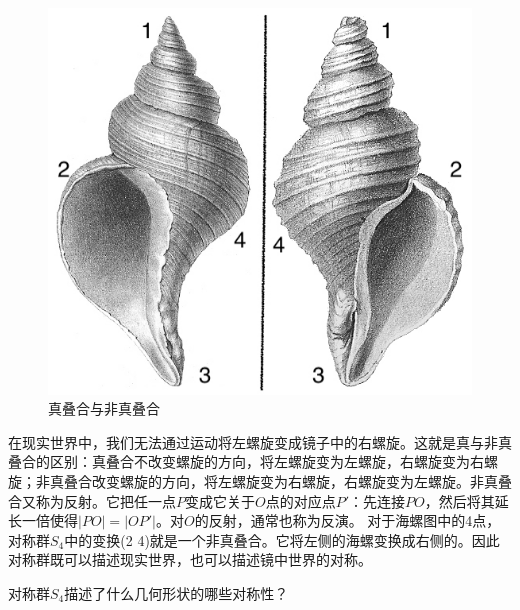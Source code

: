 \documentclass[b5paper]{ctexart}
\begin{document}
\begin{figure}[htbp]
 \centering
 \includegraphics[scale=0.3]{img/chirality.jpg}
 \caption{真叠合与非真叠合}
 \label{fig:chirality}
\end{figure}

在现实世界中，我们无法通过运动将左螺旋变成镜子中的右螺旋。这就是真与非真叠合的区别：真叠合不改变螺旋的方向，将左螺旋变为左螺旋，右螺旋变为右螺旋；非真叠合改变螺旋的方向，将左螺旋变为右螺旋，右螺旋变为左螺旋。非真叠合又称为反射\cite{Weyl1952}。它把任一点$P$变成它关于$O$点的对应点$P'$：先连接$PO$，然后将其延长一倍使得$|PO| = |OP'|$。对$O$的反射，通常也称为反演。
对于海螺图中的4点，对称群$S_4$中的变换(2 4)就是一个非真叠合。它将左侧的海螺变换成右侧的。因此对称群既可以描述现实世界，也可以描述镜中世界的对称。

\begin{Exercise}\label{ex:symmetry-and-group}
对称群$S_4$描述了什么几何形状的哪些对称性？
\end{Exercise}
\end{document}
